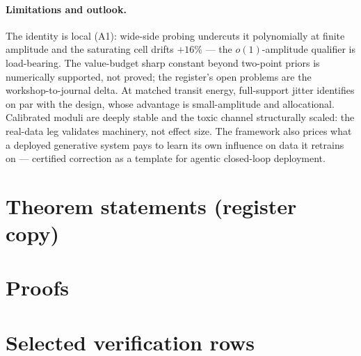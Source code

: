 \documentclass{article}
\begin{document}
\paragraph{Limitations and outlook.}\label{sec:limits} The identity is local (A1): wide-side probing undercuts it polynomially at finite amplitude and the saturating cell drifts $+16\%$ --- the $o(1)$-amplitude qualifier is load-bearing. The value-budget sharp constant beyond two-point priors is numerically supported, not proved; the register's open problems are the workshop-to-journal delta. At matched transit energy, full-support jitter identifies on par with the design, whose advantage is small-amplitude and allocational. Calibrated moduli are deeply stable and the toxic channel structurally scaled: the real-data leg validates machinery, not effect size. The framework also prices what a deployed generative system pays to learn its own influence on data it retrains on --- certified correction as a template for agentic closed-loop deployment.




\clearpage
\appendix

\section{Theorem statements (register copy)}
\label{app:theorems}


\section{Proofs}
\label{app:proofs}


\section{Selected verification rows}
\label{app:table}
\end{document}
